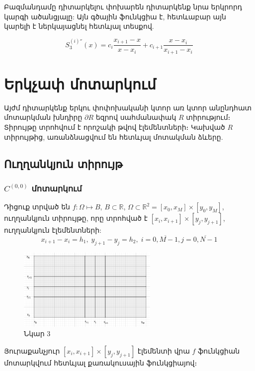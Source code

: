 \documentclass[fleqn, bachelor,subf,12pt,notitlepage]{disser}
\begin{document}
Բազմանդամը դիտարկելու փոխարեն դիտարկենք նրա երկրորդ կարգի ածանցյալը: Այն գծային ֆունկցիա է, հետևաբար այն կարելի է ներկայացնել հետևյալ տեսքով.

$$ S^{(i)''}_3(x)=c_{i}\dfrac{x_{i+1}-x}{x-x_{i}}+c_{i+1}\dfrac{x-x_{i}}{x_{i+1}-x_{i}}$$



\newpage
\section*{Երկչափ մոտարկում}

Այժմ դիտարկենք երկու փոփոխականի կտոր առ կտոր անընդհատ մոտարկման խնդիրը $\partial R$ եզրով սահմանափակ $R$ տիրությում։ Տիրույթը տրոհվում է որոշակի թվով էլեմենտների։ Կախված $R$ տիրույթից, առանձնացվում են հետևյալ մոտակման ձևերը.

\subsection*{Ուղղանկյուն տիրույթ}
\subsubsection*{$C^{(0,0)}$ մոտարկում}

Դիցուք տրված են $f:\Omega\mapsto B$,  $B \subset \mathbb{R}$, $\Omega \subset \mathbb{R}^{2} = \left[x_{0}, x_{M}\right] \times \left[y_{0}, y_{M}\right]$,  ուղղանկյուն տիրույթը, որը տրոհված է $\left[x_{i}, x_{i+1}\right] \times \left[y_{j}, y_{j+1}\right]$, ուղղանկյուն էլեմենտների:
$$x_{i+1}-x_{i}=h_{1}, \; y_{j+1}-y_{j}=h_{2}, \; i=\overline{0, M-1}, j=\overline{0, N-1}$$

\begin{figure}[h!]
\centering
\includegraphics[width=0.6\textwidth]{images/image_3}
\captionsetup{labelformat=empty}
\caption{\hfill Նկար 3}
\end{figure}

Յուրաքանչյուր  $\left[x_{i}, x_{i+1}\right] \times \left[y_{j}, y_{j+1}\right]$ էլեմենտի վրա $f$ ֆունկցիան մոտարկվում հետևյալ քառակուսային ֆունկցիայով։
\end{document}
